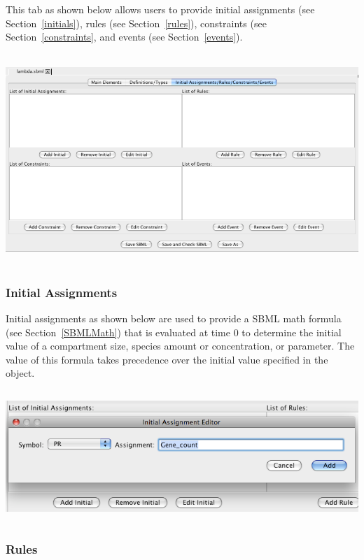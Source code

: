 \documentclass[titlepage,11pt]{article}
\begin{document}
\noindent
This tab as shown below allows users to provide initial assignments 
(see Section~\ref{initials}), 
rules (see Section~\ref{rules}), 
constraints (see Section~\ref{constraints}, and
events (see Section~\ref{events}).
\begin{center}
\includegraphics[height=80mm]{screenshots/IRCE}
\end{center}

\subsubsection{\label{initials}Initial Assignments}

\noindent
Initial assignments as shown below are used to provide a SBML math formula 
(see Section~\ref{SBMLMath}) that is evaluated at time 0 to determine 
the initial value of a compartment size, species amount or
concentration, or parameter.  The value of this formula takes precedence over
the initial value specified in the object.  
\begin{center}
\includegraphics[height=50mm]{screenshots/initial}
\end{center}

\subsubsection{\label{rules}Rules}
\end{document}
